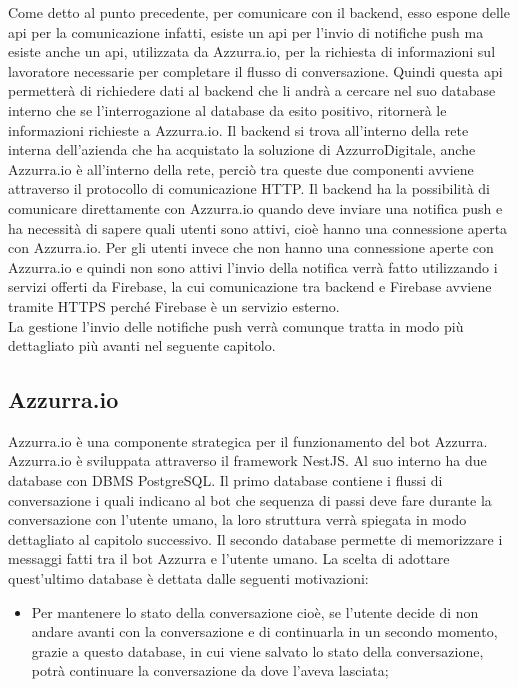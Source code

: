 \begin{trivlist}
	Come detto al punto precedente, per comunicare con il backend, esso espone delle \gls{api} per la comunicazione infatti, esiste un \gls{api} per l'invio di notifiche push ma esiste anche un \gls{api}, utilizzata da Azzurra.io, per la richiesta di informazioni sul lavoratore necessarie per completare il flusso di conversazione. Quindi questa \gls{api} permetterà di richiedere dati al backend che li andrà a cercare nel suo database interno che se l'interrogazione al database da esito positivo, ritornerà le informazioni richieste a Azzurra.io. Il backend si trova all'interno della rete interna dell'azienda che ha acquistato la soluzione di AzzurroDigitale, anche Azzurra.io è all'interno della rete, perciò tra queste due componenti avviene attraverso il protocollo di comunicazione HTTP. Il backend ha la possibilità di comunicare direttamente con Azzurra.io quando deve inviare una notifica push e ha necessità di sapere quali utenti sono attivi, cioè hanno una connessione aperta con Azzurra.io. Per gli utenti invece che non hanno una connessione aperte con Azzurra.io e quindi non sono attivi l'invio della notifica verrà fatto utilizzando i servizi offerti da Firebase, la cui comunicazione tra backend e Firebase avviene tramite HTTPS perché Firebase è un servizio esterno.\\
	La gestione l'invio delle notifiche push verrà comunque tratta in modo più dettagliato più avanti nel seguente capitolo.
	\item \subsection{Azzurra.io}
	Azzurra.io è una componente strategica per il funzionamento del bot Azzurra. Azzurra.io è sviluppata attraverso il framework NestJS. Al suo interno ha due database con DBMS PostgreSQL. Il primo database contiene i flussi di conversazione i quali indicano al bot che sequenza di passi deve fare durante la conversazione con l'utente umano, la loro struttura verrà spiegata in modo dettagliato al capitolo successivo. Il secondo database permette di memorizzare i messaggi fatti tra il bot Azzurra e l'utente umano. La scelta di adottare quest'ultimo database è dettata dalle seguenti motivazioni:
	\begin{itemize}
		\item Per mantenere lo stato della conversazione cioè, se l'utente decide di non andare avanti con la conversazione e di continuarla in un secondo momento, grazie a questo database, in cui viene salvato lo stato della conversazione, potrà continuare la conversazione da dove l'aveva lasciata;

\end{itemize}
\end{trivlist}
